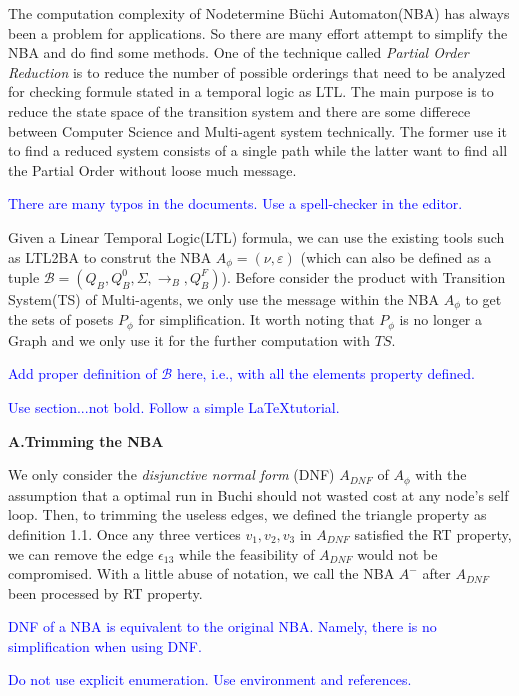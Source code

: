 \documentclass{article}
\newcommand{\blue}[1]{\textcolor{blue}{#1}}
\begin{document}
    The computation complexity of Nodetermine B{\"{u}}chi Automaton(NBA) has always been a problem for applications. 
    So there are many effort attempt to simplify the NBA and do find some methods. One of the technique called \emph{Partial Order Reduction} is to reduce the number of possible orderings that need to be analyzed for checking formule stated in  a temporal logic as LTL.  The main purpose is to reduce the state space of the transition system and there are some differece between Computer Science and Multi-agent system technically. The former use it to find a reduced system consists of a single path while the latter want to find all the Partial Order without loose much message.

\blue{There are many typos in the documents. Use a spell-checker in the editor.}
    
    
    Given a Linear Temporal Logic(LTL) formula, we can use the existing tools such as LTL2BA to construt the NBA $A_\phi=(\nu,\varepsilon)$ (which can also be defined as a tuple $\mathcal{B}=(Q_B,Q^0_B,\Sigma,\rightarrow_B,Q^F_B)$).
    Before consider the product with Transition System(TS) of Multi-agents, we only use the message within the NBA $A_\phi$ to get the sets of posets $P_\phi$ for simplification. It worth noting that $P_\phi$ is no longer a Graph and we only use it for the further computation with $TS$. 

\blue{Add proper definition of $\mathcal{B}$ here, i.e., with all the elements property defined.}

\blue{Use section...not bold. Follow a simple \LaTeX tutorial.}


    \textbf{A.Trimming the NBA}
     
    We only consider the \emph{disjunctive normal form} (DNF) $A_{DNF}$ of $A_\phi$ with the assumption that a optimal run in Buchi should not wasted cost at any node's self loop. Then, to trimming the useless edges, we defined the  triangle property as definition 1.1. Once any three vertices $v_1,v_2,v_3$ in $A_{DNF}$ 
    satisfied the RT property, we can remove the edge $\epsilon_{13}$ while the feasibility of $A_{DNF}$ would not be compromised. With a little abuse of notation, we call the NBA $A^-$ after $A_{DNF}$ been processed by RT property. 
     
\blue{DNF of a NBA is equivalent to the original NBA. Namely, there is no simplification when using DNF.}

\blue{Do not use explicit enumeration. Use environment and references.}
\end{document}
